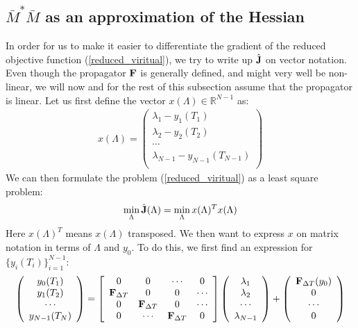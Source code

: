 \subsection{$\bar{M}^{*}\bar{M}$ as an approximation of the Hessian} 
In order for us to make it easier to differentiate the gradient of the reduced objective function (\ref{reduced_viritual}), we try to write up $\hat{\bold J}$ on vector notation. Even though the propagator $\bold F$ is generally defined, and might very well be non-linear, we will now and for the rest of this subsection assume that the propagator is linear. Let us first define the vector $x(\Lambda)\in\mathbb{R}^{N-1}$ as:
\begin{align}
x(\Lambda)= \left( \begin{array}{c}  
   \lambda_1 - y_1(T_1) \\ 
   \lambda_2 - y_2(T_2) \\
   \cdots  \\
   \lambda_{N-1} -y_{N-1}(T_{N-1})  \\
   \end{array}  \right)
\end{align} 
We can then formulate the problem (\ref{reduced_viritual}) as a least square problem:
\begin{align}
\min_{\Lambda}\hat{\bold J}(\Lambda) = \min_{\Lambda}x(\Lambda)^Tx(\Lambda) \label{vector_J}  
\end{align}
Here $x(\Lambda)^T$ means $x(\Lambda)$ transposed. We then want to express $x$ on matrix notation in terms of $\Lambda$ and $y_0$. To do this, we first find an expression for $\{y_i(T_i)\}_{i=1}^{N-1}$:
\begin{align}
\left( \begin{array}{c}
   y_0(T_1) \\  
   y_1(T_2) \\ 
   \cdots  \\
   y_{N-1}(T_N)  \\
   \end{array}  \right)= 
   \left[ \begin{array}{cccc}  
   0 & 0 & \cdots & 0 \\ 
   \bold{F}_{\Delta T}&0 & 0  & \cdots \\
   0 &  \bold{F}_{\Delta T}&0 & \cdots \\
   0 &\cdots &\bold{F}_{\Delta T}& 0   \\
   \end{array}  \right]
   \left( \begin{array}{c}
   \lambda_1 \\  
   \lambda_2 \\ 
   \cdots  \\
   \lambda_{N-1}  \\
   \end{array}  \right) + 
   \left( \begin{array}{c}
   \bold{F}_{\Delta T}(y_0)\\  
   0\\ 
   \cdots  \\
   0  \\
   \end{array}  \right)
\end{align}
